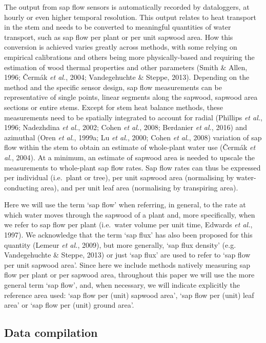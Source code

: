 \documentclass[11pt,twoside]{reedthesis}
\begin{document}
The output from sap flow sensors is automatically recorded by
dataloggers, at hourly or even higher temporal resolution. This output
relates to heat transport in the stem and needs to be converted to
meaningful quantities of water transport, such as sap flow per plant or
per unit sapwood area. How this conversion is achieved varies greatly
across methods, with some relying on empirical calibrations and others
being more physically-based and requiring the estimation of wood thermal
properties and other parameters (Smith \& Allen, 1996; Čermák \emph{et
al.}, 2004; Vandegehuchte \& Steppe, 2013). Depending on the method and
the specific sensor design, sap flow measurements can be representative
of single points, linear segments along the sapwood, sapwood area
sections or entire stems. Except for stem heat balance methods, these
measurements need to be spatially integrated to account for radial
(Phillips \emph{et al.}, 1996; Nadezhdina \emph{et al.}, 2002; Cohen
\emph{et al.}, 2008; Berdanier \emph{et al.}, 2016) and azimuthal (Oren
\emph{et al.}, 1999a; Lu \emph{et al.}, 2000; Cohen \emph{et al.}, 2008)
variation of sap flow within the stem to obtain an estimate of
whole-plant water use (Čermák \emph{et al.}, 2004). At a minimum, an
estimate of sapwood area is needed to upscale the measurements to
whole-plant sap flow rates. Sap flow rates can thus be expressed per
individual (i.e.~plant or tree), per unit sapwood area (normalising by
water-conducting area), and per unit leaf area (normalising by
transpiring area).\par

Here we will use the term `sap flow' when referring, in general, to the
rate at which water moves through the sapwood of a plant and, more
specifically, when we refer to sap flow per plant (i.e.~water volume per
unit time, Edwards \emph{et al.}, 1997). We acknowledge that the term
`sap flux' has also been proposed for this quantity (Lemeur \emph{et
al.}, 2009), but more generally, `sap flux density' (e.g. Vandegehuchte
\& Steppe, 2013) or just `sap flux' are used to refer to `sap flow per
unit sapwood area'. Since here we include methods natively measuring sap
flow per plant or per sapwood area, throughout this paper we will use
the more general term `sap flow', and, when necessary, we will indicate
explicitly the reference area used: `sap flow per (unit) sapwood area',
`sap flow per (unit) leaf area' or `sap flow per (unit) ground
area'.\par 

\subsection{Data compilation}\label{data-compilation}
\end{document}
